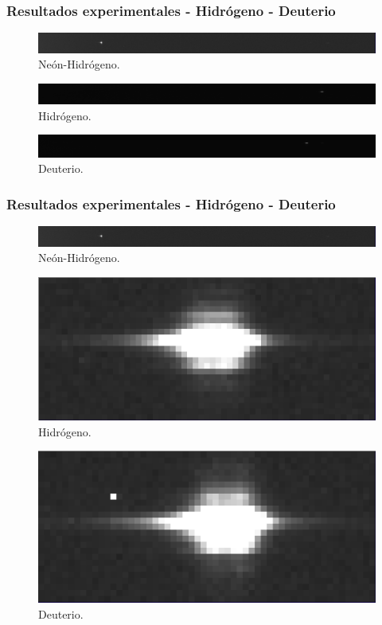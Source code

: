 \documentclass{beamer}
\begin{document}
\begin{frame}[fragile]
	\frametitle{Resultados experimentales - Hidrógeno - Deuterio}
	\begin{figure}[h!]
		\centering
		\includegraphics[width=1.\textwidth,height = 0.1\textheight]{neon-hid}
		\caption{Neón-Hidrógeno.}
	\end{figure}
	
	\begin{figure}[h!]
		\centering
		\includegraphics[width=1.\textwidth,height = 0.1\textheight]{co-hid}
		\caption{Hidrógeno.}
	\end{figure}
	
	\begin{figure}[h!]
		\centering
		\includegraphics[width=1.\textwidth,height = 0.1\textheight]{co-deu}
		\caption{Deuterio.}
	\end{figure}
\end{frame}


\begin{frame}[fragile]
	\frametitle{Resultados experimentales - Hidrógeno - Deuterio}
	\begin{figure}[h!]
		\centering
		\includegraphics[width=1.\textwidth,height = 0.1\textheight]{neon-hid}
		\caption{Neón-Hidrógeno.}
	\end{figure}
	
	\begin{figure}[h!]
		\centering
		\includegraphics[width=.7\textwidth,height = 0.1\textheight]{hid}
		\caption{Hidrógeno.}
	\end{figure}
	
	\begin{figure}[h!]
		\centering
		\includegraphics[width=.7\textwidth,height = 0.1\textheight]{deu}
		\caption{Deuterio.}
	\end{figure}
\end{frame}
\end{document}
